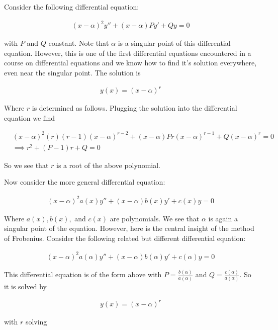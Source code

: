 \documentclass[12pt]{article}
\begin{document}
Consider the following differential equation:

\begin{align}
(x-\alpha)^2 y'' + (x-\alpha) P y' + Q y = 0
\end{align}

with $P$ and $Q$ constant. Note that $\alpha$ is a singular point of this differential equation. However, this is one of the first differential equations encountered in a course on differential equations and we know how to find it's solution everywhere, even near the singular point. The solution is

\begin{align}
y(x) = (x-\alpha)^r
\end{align}

Where $r$ is determined as follows. Plugging the solution into the differential equation we find

\begin{align}
&(x-\alpha)^2 (r)(r-1)(x-\alpha)^{r-2} + (x-\alpha) P r (x-\alpha)^{r-1} + Q (x-\alpha)^r = 0 \\
&\implies r^2 +(P-1)r + Q = 0
\end{align}

So we see that $r$ is a root of the above polynomial.

Now consider the more general differential equation:

\begin{align}
\label{gen_eqn}
(x-\alpha)^2 a(x) y'' + (x-\alpha) b(x) y' + c(x) y = 0
\end{align}

Where $a(x), b(x),$ and $c(x)$ are polynomials. We see that $\alpha$ is again a singular point of the equation. However, here is the central insight of the method of Frobenius. Consider the following related but different differential equation:

\begin{align}
\label{restrict_eqn}
(x-\alpha)^2 a(\alpha) y'' + (x-\alpha) b(\alpha) y' + c(\alpha) y = 0
\end{align}

This differential equation is of the form above with $P = \frac{b(\alpha)}{a(\alpha)}$ and $Q = \frac{c(\alpha)}{a(\alpha)}$. So it is solved by

\begin{align}
\label{ans_guess}
y(x) = (x-\alpha)^r
\end{align}

with $r$ solving
\end{document}
